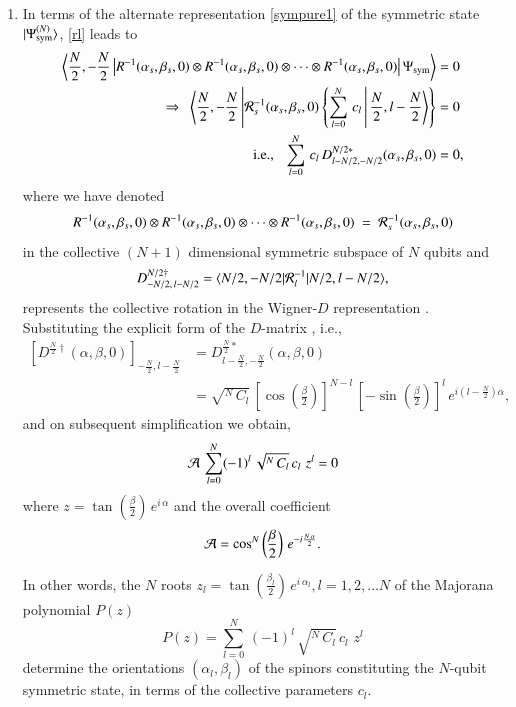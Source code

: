 \begin{enumerate}
\item In terms of the alternate representation \eqref{sympure1} of the symmetric state $\vert \Psi^{(N)}_{\rm sym}\rangle$, \eqref{rl} leads to 
{\fontsize{8pt}{10pt}\selectfont
\begin{align}
\left\langle \frac{N}{2},-\frac{N}{2}\left\vert R^{-1}(\alpha_s,\beta_s,0)\otimes R^{-1}(\alpha_s,\beta_s,0)\otimes \cdots  \otimes R^{-1}(\alpha_s,\beta_s,0) \right \vert \Psi_{\rm sym}\right\rangle&=0\nonumber \\ 
\Rightarrow\ \ \left\langle \frac{N}{2},-\frac{N}{2}\left \vert {\cal R}_s^{-1}(\alpha_s,\beta_s,0) \left\{\sum_{l=0}^N\, c_l\, \right \vert \frac{N}{2},l-\frac{N}{2}\right \rangle\right\}&=0 \nonumber \\
{\rm i.e.,} \ \ \ \sum_{l=0}^N\, c_l\, D^{N/2*}_{l-N/2,-N/2}(\alpha_s,\beta_s,0) &=0, \label{prelim}
\end{align}}\relax
where we have denoted 
$$R^{-1}(\alpha_s,\beta_s,0)\otimes R^{-1}(\alpha_s,\beta_s,0)\otimes \cdots  \otimes R^{-1}(\alpha_s,\beta_s,0)~=~{\cal R}^{-1}_s(\alpha_s,\beta_s,0)$$ 
in the collective $(N+1)$ dimensional symmetric subspace of $N$ qubits and 
$$
D^{N/2\dag}_{-N/2,\, l-N/2}=\langle N/2,-N/2\vert{\cal R}^{-1}_l \vert N/2,l-N/2\rangle,
$$
represents the collective rotation in the Wigner-$D$ representation \cite{Rose}. Substituting the explicit form of the $D$-matrix \cite{Rose}, i.e.,
{\fontsize{9pt}{11pt}\selectfont
\begin{align}
\left[D^{\frac{N}{2}\dag}(\alpha,\beta,0)\right]_{-\frac{N}{2},l-\frac{N}{2}}&= D^{\frac{N}{2}*}_{l-\frac{N}{2},-\frac{N}{2}}(\alpha,\beta,0) \nonumber\\ 
&=  \sqrt{^N\,C_l}\, \left[\cos\left(\frac{\beta}{2}\right)\right]^{N-l}\, \left[-\sin\left(\frac{\beta}{2}\right)\right]^{l} \, e^{i(l-\frac{N}{2})\alpha},\label{dmatrix}
\end{align}}\relax
and on subsequent simplification we obtain,
\begin{equation}
{\cal A}\, \sum_{l=0}^N (-1)^l\,\sqrt{^N\, C_l}\,  c_l\,  \, z^{l}=0  \label{cmj02}
\end{equation} 
where $z=\tan\left(\frac{\beta}{2}\right)\,e^{i\, \alpha}$ and the overall coefficient 
$${\cal A}=\cos^N\left(\frac{\beta}{2}\right)\,e^{-i\frac{N\,\alpha}{2}}.$$ 

In other words, the $N$ roots $z_l=\tan\left(\frac{\beta_l}{2}\right)\,e^{i\, \alpha_l}, l=1,2,\ldots N$ of the Majorana polynomial $P(z)$
\begin{equation} 
P(z)=\sum_{l=0}^N\, (-1)^l\, \sqrt{^N\, C_l}\,  c_l\,  \, z^{l}\label{Mp}
\end{equation}
determine the orientations $(\alpha_l,\beta_l)$ of the  spinors constituting the  $N$-qubit symmetric state, in terms of the collective parameters $c_l$.
\end{enumerate}

